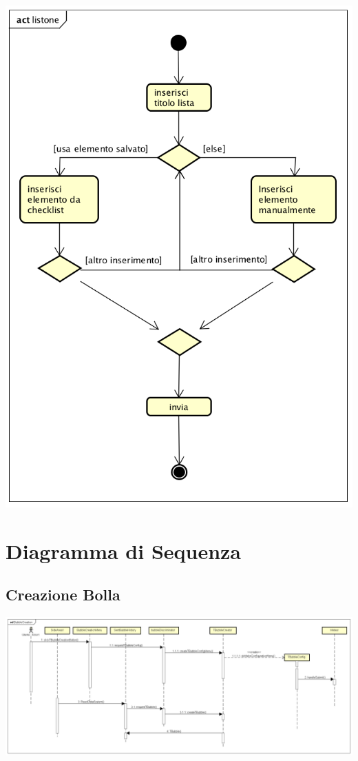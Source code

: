 \begin{center}
  \includegraphics[scale=0.5]{img/ListBubble.png}
\end{center}



\section{Diagramma di Sequenza}

\subsection{Creazione Bolla}

\begin{center}
	\includegraphics[scale=0.33]{img/CreationBubble.png}
\end{center}

